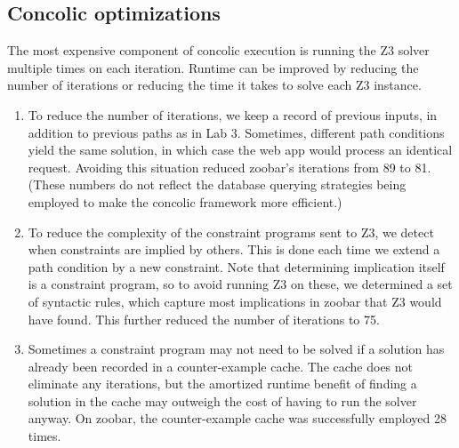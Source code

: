 \documentclass{article}
\begin{document}
\subsection{Concolic optimizations}

The most expensive component of concolic execution is running the Z3
solver multiple times on each iteration. Runtime can be improved
by reducing the number of iterations or reducing the time it takes to
solve each Z3 instance.

\begin{enumerate}
\item To reduce the number of iterations, we keep a record of previous
  inputs, in addition to previous paths as in Lab 3. Sometimes,
  different path conditions yield the same solution, in which case
  the web app would process an identical request. Avoiding this
  situation reduced zoobar's iterations from 89 to 81. (These numbers
  do not reflect the database querying strategies being employed
  to make the concolic framework more efficient.)

\item To reduce the complexity of the constraint programs sent to Z3,
  we detect when constraints are implied by others. This is done each
  time we extend a path condition by a new constraint. Note that
  determining implication itself is a constraint program, so to avoid
  running Z3 on these, we determined a set of syntactic rules, which
  capture most implications in zoobar that Z3 would have found. This
  further reduced the number of iterations to 75.

\item Sometimes a constraint program may not need to be solved if a
  solution has already been recorded in a counter-example cache. The
  cache does not eliminate any iterations, but the amortized runtime
  benefit of finding a solution in the cache may outweigh the cost of
  having to run the solver anyway. On zoobar, the counter-example
  cache was successfully employed 28 times.
\end{enumerate}
\end{document}
